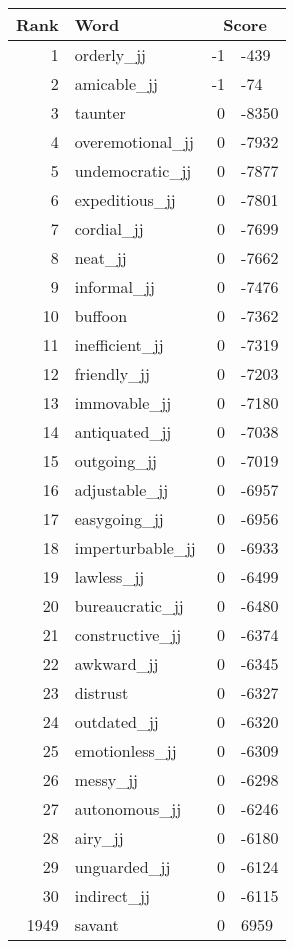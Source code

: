 \begin{longtable}[!htbp]{| rlr@{.}l |}
    \hline
    \textbf{Rank} & \textbf{Word} & \multicolumn{2}{c|}{\textbf{Score}} \\
    \hline
    \endhead
    1 & orderly\_jj & -1 & -439 \\
    2 & amicable\_jj & -1 & -74 \\
    3 & taunter & 0 & -8350 \\
    4 & overemotional\_jj & 0 & -7932 \\
    5 & undemocratic\_jj & 0 & -7877 \\
    6 & expeditious\_jj & 0 & -7801 \\
    7 & cordial\_jj & 0 & -7699 \\
    8 & neat\_jj & 0 & -7662 \\
    9 & informal\_jj & 0 & -7476 \\
    10 & buffoon & 0 & -7362 \\
    11 & inefficient\_jj & 0 & -7319 \\
    12 & friendly\_jj & 0 & -7203 \\
    13 & immovable\_jj & 0 & -7180 \\
    14 & antiquated\_jj & 0 & -7038 \\
    15 & outgoing\_jj & 0 & -7019 \\
    16 & adjustable\_jj & 0 & -6957 \\
    17 & easygoing\_jj & 0 & -6956 \\
    18 & imperturbable\_jj & 0 & -6933 \\
    19 & lawless\_jj & 0 & -6499 \\
    20 & bureaucratic\_jj & 0 & -6480 \\
    21 & constructive\_jj & 0 & -6374 \\
    22 & awkward\_jj & 0 & -6345 \\
    23 & distrust & 0 & -6327 \\
    24 & outdated\_jj & 0 & -6320 \\
    25 & emotionless\_jj & 0 & -6309 \\
    26 & messy\_jj & 0 & -6298 \\
    27 & autonomous\_jj & 0 & -6246 \\
    28 & airy\_jj & 0 & -6180 \\
    29 & unguarded\_jj & 0 & -6124 \\
    30 & indirect\_jj & 0 & -6115 \\
    1949 & savant & 0 & 6959 \\

\end{longtable}
